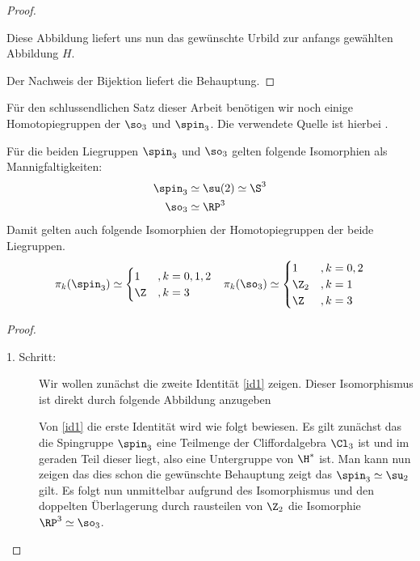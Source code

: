 \begin{Satz}
\begin{proof}
\begin{description}
      Diese Abbildung liefert uns nun das gewünschte Urbild zur
      anfangs gewählten Abbildung $H$.
    \end{description}
    Der Nachweis der Bijektion liefert die Behauptung.
\end{proof}

\end{Satz}

Für den schlussendlichen Satz dieser Arbeit benötigen wir noch einige
Homotopiegruppen der $\so_3$ und $\spin_3$. Die verwendete Quelle ist
hierbei \cite{BHMMM15}.
\begin{Lem}\label{hgroups}
	Für die beiden Liegruppen $\spin_3$ und $\so_3$ gelten
	folgende Isomorphien als Mannigfaltigkeiten:
	\begin{align}
	\spin_3 &\simeq \su(2) \simeq \S^3 \label{{id1}}\\
	\so_3 &\simeq \RP^3 \label{id2}
	\end{align}
	Damit gelten auch folgende Isomorphien der Homotopiegruppen
	der beide Liegruppen.
	\begin{align*}
	\pi_k(\spin_3) &\simeq \begin{cases}
	1 & ,k=0,1,2 \\
	\Z & ,k=3
	\end{cases}
	&{\pi_k(\so_3) \simeq \begin{cases}
		1 & ,k=0,2 \\
		\Z_2 & ,k=1 \\
		\Z & ,k=3
		\end{cases}}
	\end{align*}
	
	\begin{proof}
		\begin{description}
                \item[1. Schritt:] Wir wollen zunächst die zweite
                  Identität \cref{id1} zeigen. Dieser Isomorphismus
                  ist direkt durch folgende Abbildung anzugeben
			
                  Von \cref{id1} die erste Identität wird wie folgt
                  bewiesen.  Es gilt zunächst das die Spingruppe
                  $ \spin_3 $ eine Teilmenge der Cliffordalgebra
                  $ \Cl_3 $ ist und im geraden Teil dieser liegt, also
                  eine Untergruppe von $ \H^\ast $ ist. Man kann nun
                  zeigen das dies schon die gewünschte Behauptung
                  zeigt das $ \spin_3 \simeq \su_2 $ gilt.
				  Es folgt nun unmittelbar aufgrund des Isomorphismus
				  und den doppelten Überlagerung durch rausteilen
				  von $ \Z_2 $ die Isomorphie $ \RP^3\simeq\so_3 $.
			

\end{description}
\end{proof}
\end{Lem}
